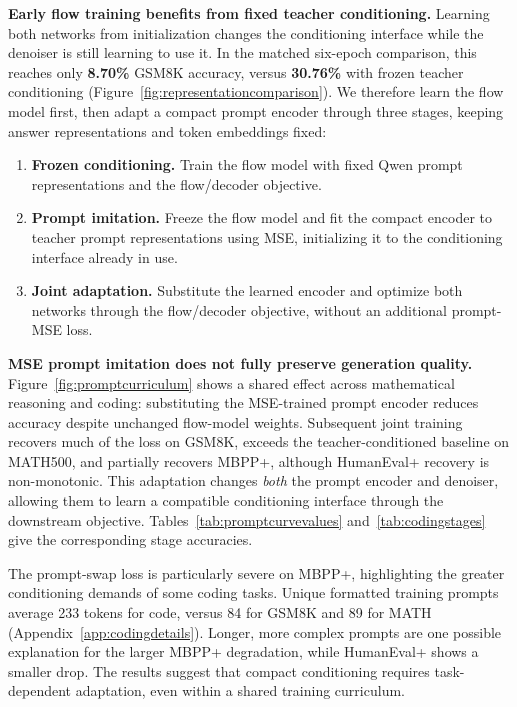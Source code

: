 \documentclass[11pt,letterpaper]{article}
\begin{document}
\textbf{Early flow training benefits from fixed teacher conditioning.}
\label{sec:conditioningcurriculum}
Learning both networks from initialization changes the conditioning interface while the denoiser is still learning to use it. In the matched six-epoch comparison, this reaches only \textbf{8.70\%} GSM8K accuracy, versus \textbf{30.76\%} with frozen teacher conditioning (Figure~\ref{fig:representationcomparison}). We therefore learn the flow model first, then adapt a compact prompt encoder through three stages, keeping answer representations and token embeddings fixed:

\begin{enumerate}
    \item \textbf{Frozen conditioning.} Train the flow model with fixed Qwen prompt representations and the flow/decoder objective.
    \item \textbf{Prompt imitation.} Freeze the flow model and fit the compact encoder to teacher prompt representations using MSE, initializing it to the conditioning interface already in use.
    \item \textbf{Joint adaptation.} Substitute the learned encoder and optimize both networks through the flow/decoder objective, without an additional prompt-MSE loss.
\end{enumerate}

\textbf{MSE prompt imitation does not fully preserve generation quality.}
Figure~\ref{fig:promptcurriculum} shows a shared effect across mathematical reasoning and coding: substituting the MSE-trained prompt encoder reduces accuracy despite unchanged flow-model weights. Subsequent joint training recovers much of the loss on GSM8K, exceeds the teacher-conditioned baseline on MATH500, and partially recovers MBPP+, although HumanEval+ recovery is non-monotonic. This adaptation changes \emph{both} the prompt encoder and denoiser, allowing them to learn a compatible conditioning interface through the downstream objective. Tables~\ref{tab:promptcurvevalues} and~\ref{tab:codingstages} give the corresponding stage accuracies.

The prompt-swap loss is particularly severe on MBPP+, highlighting the greater conditioning demands of some coding tasks. Unique formatted training prompts average 233 tokens for code, versus 84 for GSM8K and 89 for MATH (Appendix~\ref{app:codingdetails}). Longer, more complex prompts are one possible explanation for the larger MBPP+ degradation, while HumanEval+ shows a smaller drop. The results suggest that compact conditioning requires task-dependent adaptation, even within a shared training curriculum.
\end{document}
